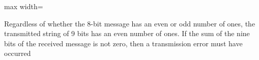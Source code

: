 \documentclass[11pt,oneside]{article}
\begin{document}
\begin{BookBody}
\begin{center}\begin{adjustbox}{max width=\linewidth}\end{adjustbox}\end{center}

\noindent Regardless of whether the 8-bit message has an even or odd number of ones, the transmitted string of 9 bits has an even number of ones. If the sum of the nine bits of the received message is not zero, then a transmission error must have occurred\BookEnd{\blacktriangle}

\end{BookBody}

\BookNarrativetrue
\end{document}
